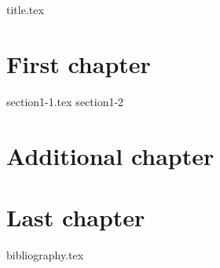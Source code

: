 \documentclass[a4paper,11pt]{book}
\begin{document}
\frontmatter
{title.tex}

\clearpage
\thispagestyle{empty}

\tableofcontents

\mainmatter
\chapter{First chapter}
{section1-1.tex}
{section1-2}

\chapter{Additional chapter}


\chapter{Last chapter}


\backmatter

{bibliography.tex}
\end{document}
